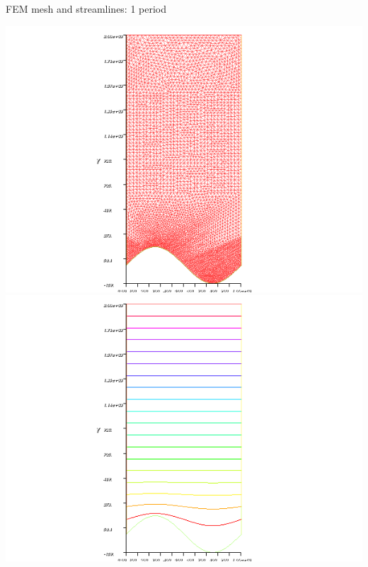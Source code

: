 \documentclass{beamer}
\begin{document}
\begin{frame}{FEM mesh and streamlines: 1 period}

\begin{center}
\includegraphics[scale=0.4, trim=4cm 0cm 4cm 0cm, clip=true]{FEM_mesh_1.png}
\includegraphics[scale=0.4, trim=4cm 0cm 4cm 0cm, clip=true]{FEM_streamlines_1.png}
\end{center}

\end{frame}
\end{document}
